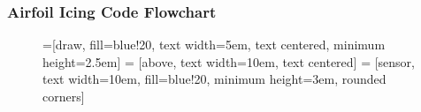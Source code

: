 \documentclass[9pt]{beamer}
\begin{document}
\begin{frame}
\frametitle{Airfoil Icing Code Flowchart}
\label{sec-3-2}

\fontsize{7}\selectfont

\begin{figure}[!ht]
  =[draw, fill=blue!20, text width=5em, 
    text centered, minimum height=2.5em]
   = [above, text width=10em, text centered]
   = [sensor, text width=10em, fill=blue!20, 
    minimum height=3em, rounded corners]
  \vspace*{-1cm}
\end{figure}
\end{frame}
\end{document}
